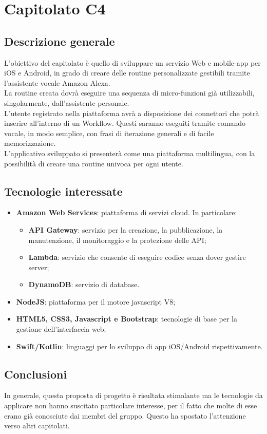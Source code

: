 \documentclass[11pt,a4paper]{article}
\begin{document}
\section{Capitolato C4}
	\subsection{Descrizione generale}
L'obiettivo del capitolato è quello di sviluppare un servizio Web e mobile-app per iOS e Android, in grado di creare delle routine personalizzate gestibili tramite l'assistente vocale Amazon Alexa.
\\ 
La routine creata dovrà eseguire una sequenza di micro-funzioni già utilizzabili, singolarmente, dall'assistente personale.
\\
L'utente registrato nella piattaforma avrà a disposizione dei connettori che potrà inserire all'interno di un Workflow. Questi saranno eseguiti tramite comando vocale, in modo semplice, con frasi di iterazione generali e di facile memorizzazione.
\\
L'applicativo sviluppato si presenterà come una piattaforma multilingua, con la possibilità di creare una routine univoca per ogni utente.

\subsection{Tecnologie interessate}
\begin{itemize}
\item \textbf{Amazon Web Services}: piattaforma di servizi cloud. In particolare:
	\begin{itemize}
	\item \textbf{API Gateway}: servizio per la creazione, la pubblicazione, la manutenzione, il monitoraggio e la protezione delle API;
	\item \textbf{Lambda}: servizio che consente di eseguire codice senza dover gestire server;
	\item  \textbf{DynamoDB}: servizio di database.
	\end{itemize}
\item \textbf{NodeJS}: piattaforma per il motore javascript V8;
\item \textbf{HTML5, CSS3, Javascript e Bootstrap}: tecnologie di base per la gestione dell'interfaccia web;
\item \textbf{Swift/Kotlin}: linguaggi per lo sviluppo di app iOS/Android rispettivamente.
\end{itemize}
\subsection{Conclusioni}
In generale, questa proposta di progetto è risultata stimolante ma le tecnologie da applicare non hanno suscitato particolare interesse, per il fatto che molte di esse erano già conosciute dai membri del gruppo. Questo ha spostato l'attenzione verso altri capitolati.
\newpage
\end{document}
